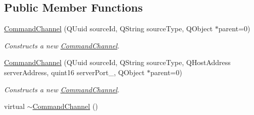 \subsection*{Public Member Functions}
\begin{DoxyCompactItemize}
\item 
\hyperlink{class_picto_1_1_command_channel_a85b38c5e9e5989ba8c1fec047e3cfbea}{Command\-Channel} (Q\-Uuid source\-Id, Q\-String source\-Type, Q\-Object $\ast$parent=0)
\begin{DoxyCompactList}\small\item\em Constructs a new \hyperlink{class_picto_1_1_command_channel}{Command\-Channel}. \end{DoxyCompactList}\item 
\hyperlink{class_picto_1_1_command_channel_a0a93aed5d539ef0a4c3ab325e6440d98}{Command\-Channel} (Q\-Uuid source\-Id, Q\-String source\-Type, Q\-Host\-Address server\-Address, quint16 server\-Port\-\_\-, Q\-Object $\ast$parent=0)
\begin{DoxyCompactList}\small\item\em Constructs a new \hyperlink{class_picto_1_1_command_channel}{Command\-Channel}. \end{DoxyCompactList}\item 
\hypertarget{class_picto_1_1_command_channel_af270c3f840dedc4d2d4f18d6471f5242}{virtual \hyperlink{class_picto_1_1_command_channel_af270c3f840dedc4d2d4f18d6471f5242}{$\sim$\-Command\-Channel} ()}\label{class_picto_1_1_command_channel_af270c3f840dedc4d2d4f18d6471f5242}


\end{DoxyCompactItemize}
